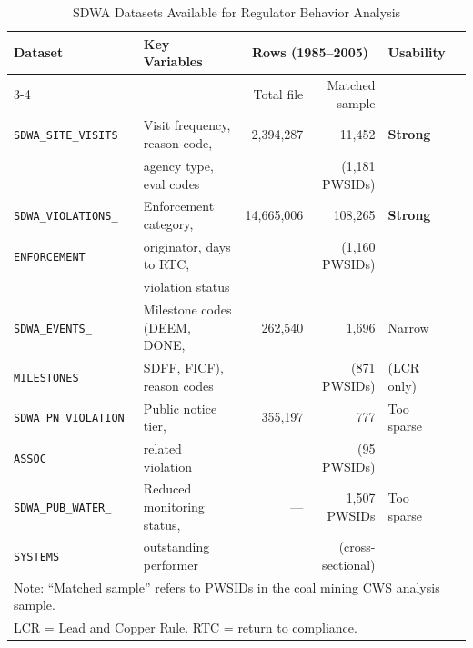 
\begin{table}[h!]
\centering
\caption{SDWA Datasets Available for Regulator Behavior Analysis}
\label{tab:sdwa_inventory}
\small
\begin{tabular}{llrrll}
\hline\hline
Dataset & Key Variables & \multicolumn{2}{c}{Rows (1985--2005)} & Usability \\
\cmidrule(lr){3-4}
 & & Total file & Matched sample & \\
\hline
\texttt{SDWA\_SITE\_VISITS} & Visit frequency, reason code, & 2,394,287 & 11,452 & \textbf{Strong} \\
 & agency type, eval codes & & (1,181 PWSIDs) & \\[4pt]
\texttt{SDWA\_VIOLATIONS\_} & Enforcement category, & 14,665,006 & 108,265 & \textbf{Strong} \\
\texttt{ENFORCEMENT} & originator, days to RTC, & & (1,160 PWSIDs) & \\
 & violation status & & & \\[4pt]
\texttt{SDWA\_EVENTS\_} & Milestone codes (DEEM, DONE, & 262,540 & 1,696 & Narrow \\
\texttt{MILESTONES} & SDFF, FICF), reason codes & & (871 PWSIDs) & (LCR only) \\[4pt]
\texttt{SDWA\_PN\_VIOLATION\_} & Public notice tier, & 355,197 & 777 & Too sparse \\
\texttt{ASSOC} & related violation & & (95 PWSIDs) & \\[4pt]
\texttt{SDWA\_PUB\_WATER\_} & Reduced monitoring status, & --- & 1,507 PWSIDs & Too sparse \\
\texttt{SYSTEMS} & outstanding performer & & (cross-sectional) & \\
\hline\hline
\multicolumn{5}{l}{\footnotesize Note: ``Matched sample'' refers to PWSIDs in the coal mining CWS analysis sample.} \\
\multicolumn{5}{l}{\footnotesize LCR = Lead and Copper Rule. RTC = return to compliance.} \\
\end{tabular}
\end{table}

